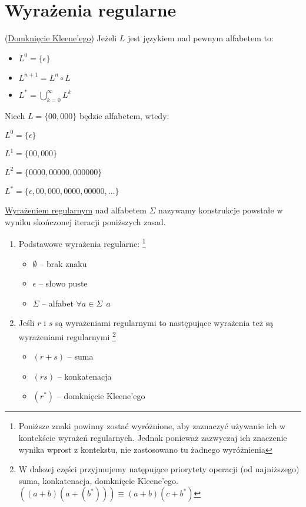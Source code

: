 \section{Wyrażenia regularne}
	
	\begin{df}(\href{http://pl.wikipedia.org/wiki/Domkni%C4%99cie_Kleene'ego}{Domknięcie Kleene'ego})
	Jeżeli $L$ jest językiem nad pewnym alfabetem to:
		\begin{itemize}
			\item $L^0 = \{\epsilon\}$
			\item $L^{n+1} = L^n \circ L$
			\item $L^* = \bigcup\limits_{k=0}^\infty L^k$
		\end{itemize}
	\end{df}	
	
	\begin{przyklad}
		Niech $L = \{00, 000\}$ będzie alfabetem, wtedy:\\
		\begin{inparaenum} 
			\item $L^0 = \{\epsilon\}$
			\item $L^1 = \{00, 000\}$
			\item $L^2 = \{0000, 00000, 000000\}$
			\item $L^* = \{\epsilon, 00, 000, 0000, 00000, \dots\}$
		\end{inparaenum}
	\end{przyklad}
	
	\begin{df} \href{http://pl.wikipedia.org/wiki/Wyra%C5%BCenia_regularne}{Wyrażeniem regularnym} nad alfabetem $\Sigma$ nazywamy konstrukcje
	 powstałe w wyniku skończonej iteracji poniższych zasad.
		\begin{enumerate}
			\item Podstawowe wyrażenia regularne: \footnote{Poniższe znaki powinny zostać wyróżnione, aby zaznaczyć używanie ich w kontekście
			wyrażeń regularnych. Jednak ponieważ zazwyczaj ich znaczenie wynika wprost z kontekstu, nie zastosowano tu żadnego wyróżnienia}
				\begin{itemize}
					\item $\emptyset$ -- brak znaku
					\item $\epsilon$ -- słowo puste
					\item $\Sigma$ -- alfabet $\forall a\in\Sigma ~~ a$
				\end{itemize}
			\item Jeśli $r$ i $s$ są wyrażeniami regularnymi to następujące wyrażenia też są wyrażeniami regularnymi
				\footnote{W dalszej części przyjmujemy natępujące priorytety operacji (od najniższego) suma, konkatenacja, domknięcie Kleene'ego. 
				$((a+b)(a+(b^*))) \equiv (a+b)(c+b^*)$}
				\begin{itemize}
					\item $(r+s)$ -- suma
					\item $(rs)$ -- konkatenacja
					\item $(r^*)$ -- domknięcie Kleene'ego
				\end{itemize}
		\end{enumerate}		
	\end{df}	
	
